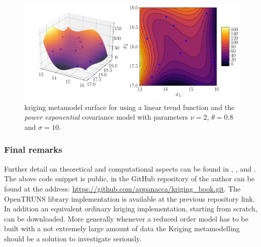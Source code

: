 \begin{figure}[h]
	\centering
	\includegraphics[width=0.9\linewidth]{appendix_a/kriging_openturns3}
	\caption{kriging metamodel surface for using a linear trend function and the \textit{power exponential} covariance model with parameters $\nu=2$, $\theta=0.8$ and $\sigma=10$.}
	\label{fig:kriging_openturns3}
\end{figure}


\subsubsection{Final remarks}
Further detail on theoretical and computational aspects can be found in \citet{cavazzuti2012optimization}, \citet{dakota}, \citet{sacks1989design} and \citet{openturns}.
The above code snippet is public, in the GitHub repository of the author can be found at the address: \url{https://github.com/appanacca/kriging_book.git}.
The OpenTRUNS library implementation is available at the previous repository link. In addition an equivalent ordinary kriging implementation, starting from scratch, can be downloaded.
More generally whenever a reduced order model has to be built with a not extremely large amount of data the Kriging metamodelling should be a solution to investigate seriously.
